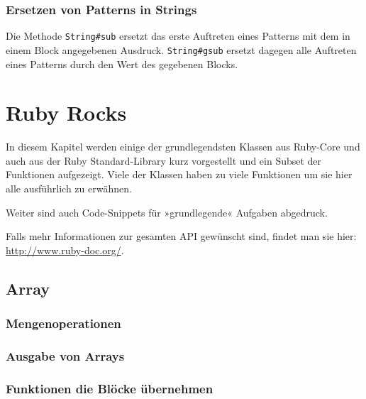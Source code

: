 \documentclass[a4book,11pt,twoside]{scrbook}
\begin{document}
\subsection*{Ersetzen von Patterns in Strings} %
\label{sub:ersetzen_von_patterns_in_strings}
Die Methode \texttt{String\#sub} ersetzt das erste Auftreten eines Patterns mit dem in einem Block angegebenen Ausdruck. \texttt{String\#gsub} ersetzt dagegen alle Auftreten eines Patterns durch den Wert des gegebenen Blocks.










\chapter{Ruby Rocks} %
\label{cha:ruby_types}
In diesem Kapitel werden einige der grundlegendsten Klassen aus Ruby-Core und auch aus der Ruby Standard-Library kurz vorgestellt und ein Subset der Funktionen aufgezeigt. Viele der Klassen haben zu viele Funktionen um sie hier alle ausführlich zu erwähnen.

Weiter sind auch Code-Snippets für »grundlegende« Aufgaben abgedruck.

Falls mehr Informationen zur gesamten API gewünscht sind, findet man sie hier: \url{http://www.ruby-doc.org/}.



\section{Array} %
\label{sec:array}
\subsection{Mengenoperationen} %
\label{sub:mengenoperationen}


\subsection{Ausgabe von Arrays} %
\label{ssub:ausgabe_von_arrays}


\subsection{Funktionen die Blöcke übernehmen} %
\label{sub:funktionen_die_blöcke_übernehmen}

\end{document}
